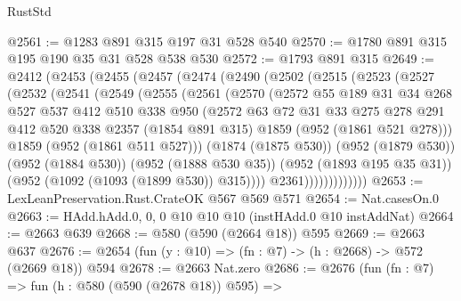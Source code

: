 \begin{lexlean}{RustStd}
\begin{coremodule}
@2561 := @1283 @891 @315 @197 @31 @528 @540
@2570 := @1780 @891 @315 @195 @190 @35 @31 @528 @538 @530
@2572 := @1793 @891 @315
@2649 := @2412
    (@2453
      (@2455
        (@2457
          (@2474
            (@2490
              (@2502
                (@2515
                  (@2523
                    (@2527
                      (@2532
                        (@2541
                          (@2549
                            (@2555
                              (@2561
                                (@2570
                                  (@2572
                                    @55
                                    @189
                                    @31
                                    @34
                                    @268
                                    @527
                                    @537
                                    @412
                                    @510
                                    @338
                                    @950
                                    (@2572
                                      @63
                                      @72
                                      @31
                                      @33
                                      @275
                                      @278
                                      @291
                                      @412
                                      @520
                                      @338
                                      @2357
                                      (@1854 @891 @315)
                                      @1859
                                      (@952 (@1861 @521 @278)))
                                    @1859
                                    (@952 (@1861 @511 @527)))
                                  (@1874 (@1875 @530))
                                  (@952 (@1879 @530))
                                  (@952 (@1884 @530))
                                  (@952 (@1888 @530 @35))
                                  (@952 (@1893 @195 @35 @31))
                                  (@952 (@1092 (@1093 (@1899 @530)) @315))))
                              @2361)))))))))))))
@2653 := LexLeanPreservation.Rust.CrateOK @567 @569 @571
@2654 := Nat.casesOn.{0}
@2663 := HAdd.hAdd.{0, 0, 0} @10 @10 @10 (instHAdd.{0} @10 instAddNat)
@2664 := @2663 @639
@2668 := @580 (@590 (@2664 @18)) @595
@2669 := @2663 @637
@2676 := @2654 (fun (y : @10) => (fn : @7) -> (h : @2668) -> @572 (@2669 @18)) @594
@2678 := @2663 Nat.zero
@2686 := @2676
    (fun (fn : @7) =>
    fun (h : @580 (@590 (@2678 @18)) @595) =>

\end{coremodule}
\end{lexlean}
